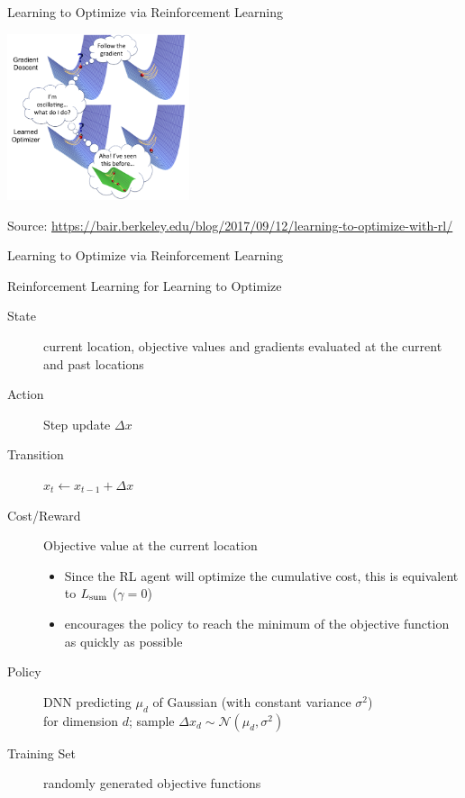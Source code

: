 \begin{frame}[c]{Learning to Optimize via Reinforcement Learning }

\centering
\includegraphics[width=0.4\textwidth]{images/l2o_comic}

\tiny
Source: \url{https://bair.berkeley.edu/blog/2017/09/12/learning-to-optimize-with-rl/}

\end{frame}
\begin{frame}[c]{Learning to Optimize via Reinforcement Learning }

\begin{block}{Reinforcement Learning for Learning to Optimize}
\begin{description}
\item[State] current location, objective values and gradients evaluated at the current and past locations
\pause
\item[Action] Step update $\Delta x$
\pause
\item[Transition] $x_t \leftarrow x_{t-1} + \Delta x$
\pause
\item[Cost/Reward] Objective value at the current location
\begin{itemize}
\item Since the RL agent will optimize the cumulative cost, this is equivalent to $L_{\text{sum}}$  ($\gamma=0$)
\item encourages the policy to reach the minimum of the objective function as quickly as possible
\end{itemize}
\pause
\item[Policy] DNN predicting $\mu_d$ of Gaussian (with constant variance $\sigma^2$)\\ for dimension $d$; sample $\Delta x_d \sim \mathcal{N}(\mu_d, \sigma^2)$
\pause
\item[Training Set] randomly generated objective functions
\end{description}
\end{block}

\end{frame}
